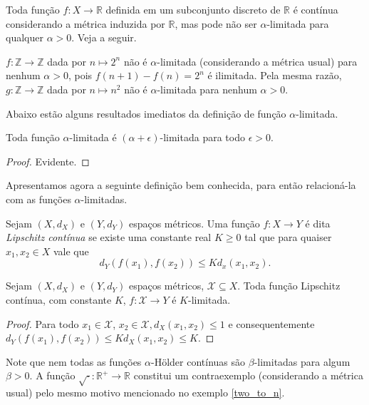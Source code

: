 Toda função $f : X \to \mathbb{R}$ definida em um subconjunto discreto de $\mathbb{R}$ é contínua considerando a métrica induzida por $\mathbb{R}$, mas pode não ser $\alpha$-limitada para qualquer $\alpha > 0$. Veja a seguir.

\begin{example} \label{two_to_n}
  $f : \mathbb{Z} \to \mathbb{Z}$ dada por $n \mapsto 2^n$ não é $\alpha$-limitada (considerando a métrica usual) para nenhum $\alpha > 0$, pois $f(n + 1) - f(n) = 2^{n}$ é ilimitada. Pela mesma razão, $g: \mathbb{Z} \to \mathbb{Z}$ dada por $n \mapsto n^2$ não é $\alpha$-limitada para nenhum $\alpha > 0$.
\end{example}

Abaixo estão alguns resultados imediatos da definição de função $\alpha$-limitada.

\begin{theorem}
  Toda função $\alpha$-limitada é $(\alpha+\epsilon)$-limitada para todo $\epsilon > 0$.
\end{theorem}
\begin{proof}
  Evidente.
\end{proof}

Apresentamos agora a seguinte definição bem conhecida, para então relacioná-la com as funções $\alpha$-limitadas.

\begin{definition*}
    Sejam $(X, d_X)$ e $(Y, d_Y)$ espaços métricos. Uma função $f : X \to Y$ é dita \textit{Lipschitz contínua} se existe uma constante real $K \ge 0$ tal que para quaiser $x_1, x_2 \in X$ vale que \[d_Y\left(f(x_1), f(x_2)\right) \le K d_x\left(x_1, x_2\right).\]
\end{definition*}

\begin{theorem}
  Sejam $(X, d_X)$ e $(Y, d_Y)$ espaços métricos, $\mathcal{X} \subseteq X$. Toda função Lipschitz contínua, com constante $K$, $f : \mathcal{X} \to Y$ é $K$-limitada.
\end{theorem}
\begin{proof}
  Para todo $x_1 \in \mathcal{X}$, $x_2 \in \mathcal{X}, d_X(x_1, x_2) \le 1$ e consequentemente $d_Y(f(x_1), f(x_2)) \le K d_X(x_1, x_2) \le K$.
\end{proof}
Note que nem todas as funções $\alpha$-Hölder contínuas são $\beta$-limitadas para algum $\beta > 0$. A função $\sqrt{\cdot} : \mathbb{R}^+ \to \mathbb{R}$ constitui um contraexemplo (considerando a métrica usual) pelo mesmo motivo mencionado no exemplo \ref{two_to_n}.

